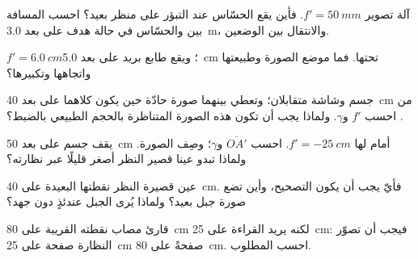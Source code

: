 \begin{exercise}[$\star\star$]\label{exo:g11:lenses-and-eye:6}
 آلة تصوير $f' = \qty{50}{mm}$. فأين يقع الحسّاس عند التبؤر
على منظر بعيد؟ احسب المسافة بين  والحسّاس في حالة هدف على بعد
\qty{3.0}{m}، والانتقال بين الوضعين.
\end{exercise}

\begin{exercise}[$\star\star$]\label{exo:g11:lenses-and-eye:7}
 $f' = \qty{6.0}{cm}$؛ ويقع طابع بريد على بعد \qty{5.0}{cm} تحتها.
فما موضع الصورة وطبيعتها واتجاهها وتكبيرها؟
\end{exercise}

\begin{exercise}[$\star\star$]\label{exo:g11:lenses-and-eye:8}
جسم وشاشة متقابلان؛ وتعطي  بينهما
صورة حادّة حين يكون كلاهما على بعد \qty{40}{cm} من . احسب
$f'$ و$\gamma$. ولماذا يجب أن تكون هذه الصورة المتناظرة بالحجم الطبيعي بالضبط؟
\end{exercise}

\begin{exercise}[$\star\star$]\label{exo:g11:lenses-and-eye:9}
يقف جسم على بعد \qty{50}{cm} أمام  لها
$f' = \qty{-25}{cm}$. احسب $\overline{OA'}$ و$\gamma$؛ وصِف
الصورة. ولماذا تبدو عينا قصير النظر أصغر قليلًا عبر
نظارته؟
\end{exercise}

\begin{exercise}[$\star\star$]\label{exo:g11:lenses-and-eye:10}
عين قصيرة النظر نقطتها البعيدة على \qty{40}{cm}. فأيّ  يجب أن يكون
 التصحيح، وأين تضع صورة جبل بعيد؟ ولماذا يُرى الجبل
عندئذٍ دون جهد؟
\end{exercise}

\begin{exercise}[$\star\star$]\label{exo:g11:lenses-and-eye:11}
قارئ مصاب  نقطته القريبة على \qty{80}{cm} لكنه يريد
القراءة على \qty{25}{cm}: فيجب أن تصوّر النظارة صفحة على \qty{25}{cm}
صفحةً  على \qty{80}{cm}. احسب  المطلوب.
\end{exercise}


